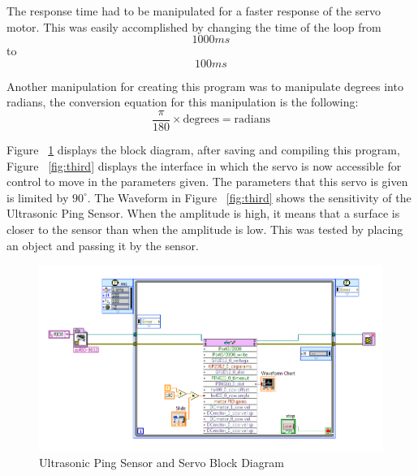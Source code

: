 \documentclass{scrartcl}
\begin{document}
The response time had to be manipulated for a faster response of the servo motor. This was easily accomplished by changing the time of the loop from $$1000ms$$ to $$100ms$$

Another manipulation for creating this program was to manipulate degrees into radians, the conversion equation for this manipulation is the following:
$$\frac{\pi}{180}\times \text{degrees}=\text{radians}$$

Figure ~\ref{fig:second} displays the block diagram, after saving and compiling this program, Figure ~\ref{fig:third}  displays the interface in which the servo is now accessible for control to move in the parameters given. The parameters that this servo is given is limited by $90^\circ$. The Waveform in Figure ~\ref{fig:third} shows the sensitivity of the Ultrasonic Ping Sensor. When the amplitude is high, it means that a surface is closer to the sensor than when the amplitude is low. This was tested by placing an object and passing it by the sensor.

\begin{figure}[H]
  \centering
    \includegraphics[width=1\textwidth]{servo_block.png}
    \caption{Ultrasonic Ping Sensor and Servo Block Diagram}
    \label{fig:second}
\end{figure}
\end{document}
